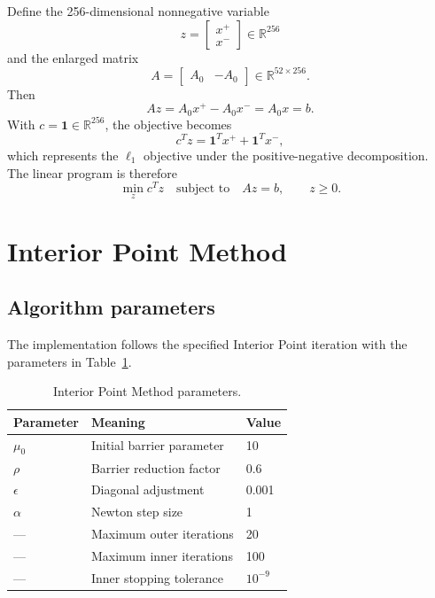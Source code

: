 \documentclass[11pt]{article}
\newcommand{\R}{\mathbb{R}}
\begin{document}
Define the 256-dimensional nonnegative variable
\[
z=
\begin{bmatrix}
x^+\\
x^-
\end{bmatrix}
\in\R^{256}
\]
and the enlarged matrix
\[
A=
\begin{bmatrix}
A_0 & -A_0
\end{bmatrix}
\in\R^{52\times 256}.
\]
Then
\[
Az=A_0x^+-A_0x^-=A_0x=b.
\]
With $c=\mathbf{1}\in\R^{256}$, the objective becomes
\[
c^Tz=\mathbf{1}^Tx^+ + \mathbf{1}^Tx^-,
\]
which represents the $\ell_1$ objective under the positive-negative decomposition. The linear program is therefore
\begin{equation}
\label{eq:lp}
\min_z c^Tz
\quad\text{subject to}\quad
Az=b,
\qquad z\ge 0.
\end{equation}

\section{Interior Point Method}
\subsection{Algorithm parameters}

The implementation follows the specified Interior Point iteration with the parameters in Table~\ref{tab:params}.

\begin{table}[H]
\centering
\caption{Interior Point Method parameters.}
\label{tab:params}
\begin{tabular}{lll}
\toprule
\textbf{Parameter} & \textbf{Meaning} & \textbf{Value} \\
\midrule
$\mu_0$ & Initial barrier parameter & 10 \\
$\rho$ & Barrier reduction factor & 0.6 \\
$\epsilon$ & Diagonal adjustment & 0.001 \\
$\alpha$ & Newton step size & 1 \\
--- & Maximum outer iterations & 20 \\
--- & Maximum inner iterations & 100 \\
--- & Inner stopping tolerance & $10^{-9}$ \\
\bottomrule
\end{tabular}
\end{table}
\end{document}
